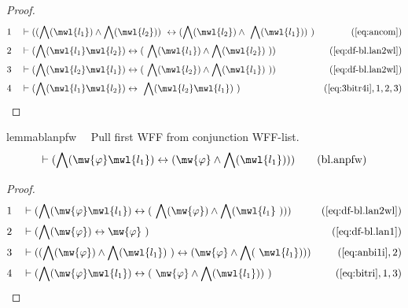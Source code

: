 \begin{proof}
\begin{align}
  1 &&  & \vdash ( ( \bigwedge( \mwl{l_1} ) \wedge \bigwedge( \mwl{l_2} ) )
     ~\leftrightarrow ( \bigwedge( \mwl{l_2} ) \wedge
     ~\bigwedge( \mwl{l_1} ) )
     ~)&(\mbox{\ref{eq:ancom}})\notag
  \\ 2 &&  & \vdash ( \bigwedge( \mwl{l_1} \mwl{l_2} ) \leftrightarrow (
     ~\bigwedge( \mwl{l_1} ) \wedge \bigwedge( \mwl{l_2} )
     ~) )&(\mbox{\ref{eq:df-bl.lan2wl}})\notag
  \\ 3 &&  & \vdash ( \bigwedge( \mwl{l_2} \mwl{l_1} ) \leftrightarrow (
     ~\bigwedge( \mwl{l_2} ) \wedge \bigwedge( \mwl{l_1} )
     ~) )&(\mbox{\ref{eq:df-bl.lan2wl}})\notag
  \\ 4 &&  & \vdash ( \bigwedge( \mwl{l_1} \mwl{l_2} ) \leftrightarrow
     ~\bigwedge( \mwl{l_2} \mwl{l_1} )
     ~)&(\mbox{\ref{eq:3bitr4i}},1,2,3)\notag
\end{align}
\end{proof}

\begin{restatable}{lemma}{blanpfw}~~ Pull first WFF from conjunction WFF-list.
\begin{align}
\vdash ( \bigwedge( \mw{\varphi} \mwl{l_1} ) \leftrightarrow ( \mw{\varphi}
    \wedge \bigwedge( \mwl{l_1} ) ) )\label{eq:bl.anpfw}\tag{bl.anpfw}
\end{align}
\end{restatable}

\begin{proof}
\begin{align}
  1 &&  & \vdash ( \bigwedge( \mw{\varphi} \mwl{l_1} ) \leftrightarrow (
     ~\bigwedge( \mw{\varphi} ) \wedge \bigwedge( \mwl{l_1}
     ~) ) )&(\mbox{\ref{eq:df-bl.lan2wl}})\notag
  \\ 2 &&  & \vdash ( \bigwedge( \mw{\varphi} ) \leftrightarrow \mw{\varphi}
     ~)&(\mbox{\ref{eq:df-bl.lan1}})\notag
  \\ 3 &&  & \vdash ( ( \bigwedge( \mw{\varphi} ) \wedge \bigwedge( \mwl{l_1} )
     ~) \leftrightarrow ( \mw{\varphi} \wedge \bigwedge(
     ~\mwl{l_1} ) ) )&(\mbox{\ref{eq:anbi1i}},2)\notag
  \\ 4 &&  & \vdash ( \bigwedge( \mw{\varphi} \mwl{l_1} ) \leftrightarrow (
     ~\mw{\varphi} \wedge \bigwedge( \mwl{l_1} ) )
     ~)&(\mbox{\ref{eq:bitri}},1,3)\notag
\end{align}
\end{proof}

